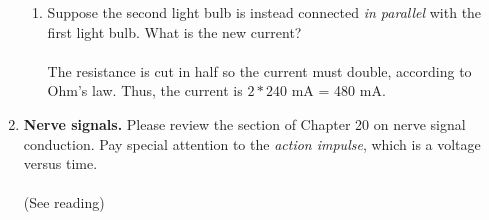 \documentclass[10pt]{article}
\begin{document}
\begin{enumerate}
\begin{enumerate}
\item Suppose the second light bulb is instead connected \textit{in parallel} with the first light bulb.  What is the new current? \\ \\ The resistance is cut in half so the current must double, according to Ohm's law.  Thus, the current is $2*240$ mA = 480 mA.
\end{enumerate}
\item \textbf{Nerve signals.} Please review the section of Chapter 20 on nerve signal conduction.  Pay special attention to the \textit{action impulse}, which is a voltage versus time. \\ \\ (See reading) \\
\end{enumerate}
\end{document}
